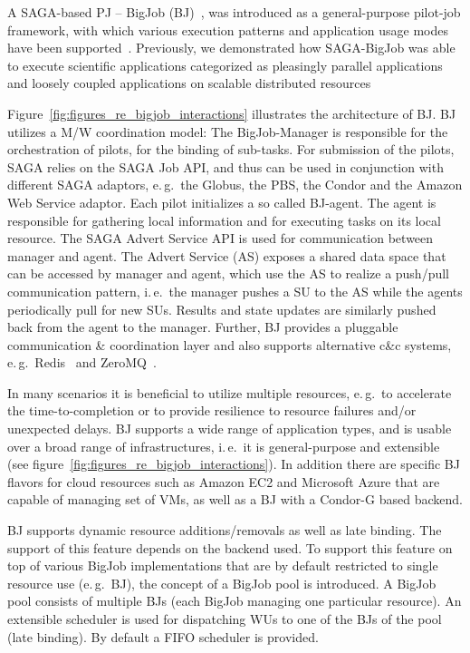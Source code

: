 \documentclass[]{svjour3}
\begin{document}
A SAGA-based PJ -- BigJob
(BJ)~\cite{bigjob_web,saga_bigjob_condor_cloud}, was introduced as a
general-purpose pilot-job framework, with which various execution
patterns and application usage modes have been
supported~\cite{async_repex11,saga-royalsoc}. Previously, we
demonstrated how SAGA-BigJob was able to execute scientific
applications categorized as pleasingly parallel applications and
loosely coupled applications on scalable distributed
resources\cite{DBLP:conf/hpdc/KimHMAJ10, dare-ecmls11, ecmls11}

Figure~\ref{fig:figures_re_bigjob_interactions} illustrates the
architecture of BJ. BJ utilizes a M/W coordination model: The
BigJob-Manager is responsible for the orchestration of pilots, for the
binding of sub-tasks. For submission of the pilots, SAGA relies on the
SAGA Job API, and thus can be used in conjunction with different SAGA
adaptors, e.\,g.\ the Globus, the PBS, the Condor and the Amazon Web
Service adaptor. Each pilot initializes a so called BJ-agent. The
agent is responsible for gathering local information and for executing
tasks on its local resource. The SAGA Advert Service API is used for
communication between manager and agent. The Advert Service (AS)
exposes a shared data space that can be accessed by manager and agent,
which use the AS to realize a push/pull communication pattern, i.\,e.\
the manager pushes a SU to the AS while the agents periodically pull
for new SUs. Results and state updates are similarly pushed back from
the agent to the manager. Further, BJ provides a pluggable
communication \& coordination layer and also supports alternative c\&c
systems, e.\,g.\ Redis~\cite{redis} and ZeroMQ~\cite{zmq}.

In many scenarios it is beneficial to utilize multiple resources,
e.\,g.\ to accelerate the time-to-completion or to provide resilience
to resource failures and/or unexpected delays. 
BJ supports a wide range of application types, and is usable over a
broad range of infrastructures, i.\,e.\ it is general-purpose and
extensible (see figure~\ref{fig:figures_re_bigjob_interactions}). In
addition there are specific BJ flavors for cloud resources such as
Amazon EC2 and Microsoft Azure that are capable of managing set of
VMs, as well as a BJ with a Condor-G based backend.

BJ supports dynamic resource additions/removals as well as late
binding. The support of this feature depends on the backend used. To
support this feature on top of various BigJob implementations that are
by default restricted to single resource use (e.\,g.\ BJ), the concept
of a BigJob pool is introduced. A BigJob pool consists of multiple BJs
(each BigJob managing one particular resource). An extensible
scheduler is used for dispatching WUs to one of the BJs of the pool
(late binding). By default a FIFO scheduler is provided.
\end{document}
